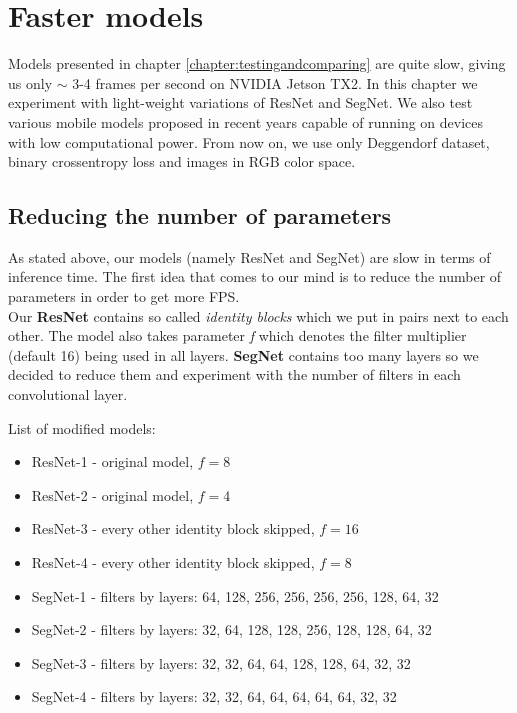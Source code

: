 \chapter{Faster models}
\label{chapter:fastermodels}

Models presented in chapter \ref{chapter:testingandcomparing} are quite slow,
giving us only $\sim$ 3-4 frames per second on NVIDIA Jetson TX2. 
In this chapter we experiment with light-weight variations of ResNet and SegNet. We also test
various mobile models proposed in recent years capable of running on devices with
low computational power. From now on, we use only Deggendorf dataset, binary crossentropy loss
and images in RGB color space.

\section{Reducing the number of parameters}
\label{sec:reduce_params}

As stated above, our models (namely ResNet and SegNet) are slow in terms of inference time.
The first idea that comes to our mind is to reduce the number of parameters in order
to get more FPS.\\

Our \textbf{ResNet} contains so called \textit{identity blocks} which we put in
pairs next to each other. The model also takes parameter \textit{f} which denotes the
filter multiplier (default 16) being used in all layers.
\textbf{SegNet} contains too many layers so we decided to reduce them and experiment
with the number of filters in each convolutional layer.

List of modified models:

\begin{itemize}
    \item ResNet-1 - original model, $f=8$
    \item ResNet-2 - original model, $f=4$
    \item ResNet-3 - every other identity block skipped, $f=16$
    \item ResNet-4 - every other identity block skipped, $f=8$
    
    \item SegNet-1 - filters by layers: 64, 128, 256, 256, 256, 256, 128, 64, 32
    \item SegNet-2 - filters by layers: 32, 64, 128, 128, 256, 128, 128, 64, 32
    \item SegNet-3 - filters by layers: 32, 32, 64, 64, 128, 128, 64, 32, 32
    \item SegNet-4 - filters by layers: 32, 32, 64, 64, 64, 64, 64, 32, 32
\end{itemize}

